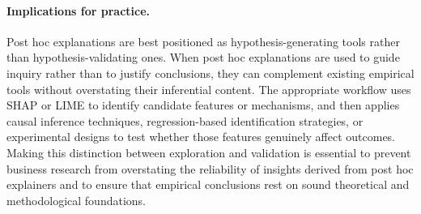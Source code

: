 \documentclass[11pt]{article}
\begin{document}
\paragraph{Implications for practice.}
Post hoc explanations are best positioned as hypothesis-generating tools rather than hypothesis-validating ones. When post hoc explanations are used to guide inquiry rather than to justify conclusions, they can complement existing empirical tools without overstating their inferential content. The appropriate workflow uses SHAP or LIME to identify candidate features or mechanisms, and then applies causal inference techniques, regression-based identification strategies, or experimental designs to test whether those features genuinely affect outcomes. %
Making this distinction between exploration and validation is essential to prevent business research from overstating the reliability of insights derived from post hoc explainers and to ensure that empirical conclusions rest on sound theoretical and methodological foundations.
{\small

}
\end{document}
